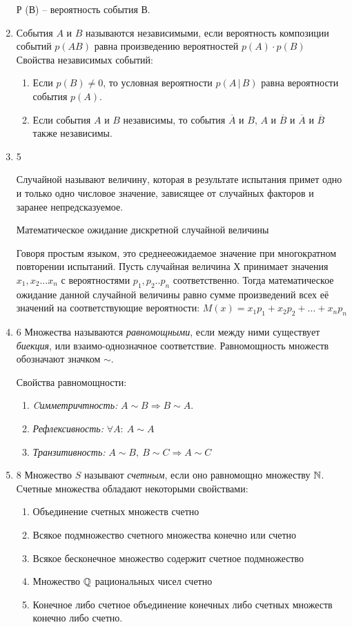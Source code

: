 \documentclass[a4paper,12pt]{article}
\begin{document}
\begin{enumerate}
    Р (В) – вероятность события В. 
    
        \item
        События $A$ и $B$ называются независимыми, если вероятность композиции событий $p(AB)$ равна произведению вероятностей 		$p(A)\cdot p(B)$
        \medskip\\
        Свойства независимых событий: \begin{enumerate}
            \item Если $p(B)\ne0$, то условная вероятности $p(A\,|\,B)$ равна вероятности события $p(A)$.
            \item Если события $A$ и $B$ независимы, то события $\overline{A}$ и $B$, $A$ и $\overline{B}$ и $\overline{A}$ и 	$\overline{B}$ также независимы.
        \end{enumerate}
	
	\item 5
    
	    Случайной называют величину, которая в результате испытания примет одно и только одно числовое значение, зависящее от случайных факторов и заранее непредсказуемое.

	    Математическое ожидание дискретной случайной величины

	Говоря простым языком, это среднееожидаемое значение при многократном повторении испытаний. Пусть случайная величина Х принимает значения $x_1, x_2 ... x_n$ с вероятностями $p_1, p_2 .. p_n$ соответственно. Тогда математическое ожидание  данной случайной величины равно сумме произведений всех её значений на соответствующие вероятности:
	$M(x) = x_1 p_1 + x_2 p_2 + ... + x_n p_n$
		\item 6
		Множества называются \textit{равномощными}, если между ними существует \textit{биекция}, или взаимо-однозначное 	соответствие. Равномощность множеств обозначают значком $\sim$.
		
		Свойства равномощности:
		\begin{enumerate}
			\item \textit{Cимметричтность:} $A \sim B \Rightarrow B \sim A$.
			\item \textit{Рефлексивность:} $\forall A: \ A \sim A$
			\item \textit{Транзитивность:} $A \sim B, \ B \sim C  \Rightarrow A \sim C$
		\end{enumerate}
	
		\item 8
		Множество $S$ называют \textit{счетным}, если оно равномощно множеству $\mathbb{N}$.	Счетные множества обладают некоторыми свойствами:
		\begin{enumerate}
			\item Объединение счетных множеств счетно
			\item Всякое подмножество счетного множества конечно или счетно
			\item Всякое бесконечное множество содержит счетное подмножество
			\item Множество $\mathbb{Q}$ рациональных чисел счетно
			\item 
			Конечное либо счетное объединение конечных либо счетных множеств конечно либо счетно.
			

\end{enumerate}
\end{enumerate}
\end{document}
